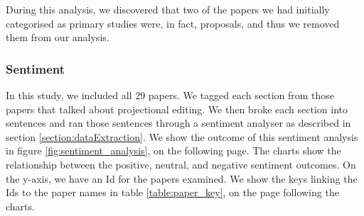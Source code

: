 \begin{figure}[h]
    \centering
\end{figure}

During this analysis, we discovered that two of the papers we had initially categorised as primary studies were, in fact, proposals, and thus we removed them from our analysis.

\subsubsection{Sentiment}

In this study, we included all 29 papers.
We tagged each section from those papers that talked about projectional editing.
We then broke each section into sentences and ran those sentences through a sentiment analyser as described in section \ref{section:dataExtraction}.
We show the outcome of this sentiment analysis in figure \ref{fig:sentiment_analysis}, on the following page. 
The charts show the relationship between the positive, neutral, and negative sentiment outcomes.
On the y-axis, we have an Id for the papers examined. 
We show the keys linking the Ids to the paper names in table \ref{table:paper_key}, on the page following the charts.

